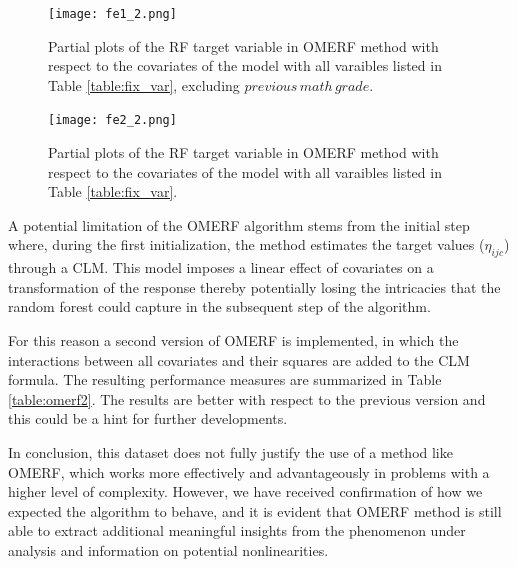\begin{figure}[H]
    \centering
    \texttt{[image: fe1\_2.png]}
    \caption{Partial plots of the RF target variable in OMERF method with respect to the covariates of the model with all varaibles listed in Table \ref{table:fix_var}, excluding \(previous \, math \, grade\).}
    \label{fig:fe1}
\end{figure}

\begin{figure}[H]
    \centering
    \texttt{[image: fe2\_2.png]}
    \caption{Partial plots of the RF target variable in OMERF method with respect to the covariates of the model with all varaibles listed in Table \ref{table:fix_var}.}
    \label{fig:fe2}
\end{figure}

A potential limitation of the OMERF algorithm stems from the initial step where, during the first initialization, the method estimates the target values (\(\eta_{ijc}\)) through a CLM.
This model imposes a linear effect of covariates on a transformation of the response thereby potentially losing the intricacies that the random forest could capture in the subsequent step of the algorithm.

For this reason a second version of OMERF is implemented, in which the interactions between all covariates and their squares are added to the CLM formula. The resulting performance measures are summarized in Table \ref{table:omerf2}.
The results are better with respect to the previous version and this could be a hint for further developments.

In conclusion, this dataset does not fully justify the use of a method like OMERF, which works more effectively and advantageously in problems with a higher level of complexity.
However, we have received confirmation of how we expected the algorithm to behave, and it is evident that OMERF method is still able to extract additional meaningful insights from the phenomenon under analysis and information on potential nonlinearities.

